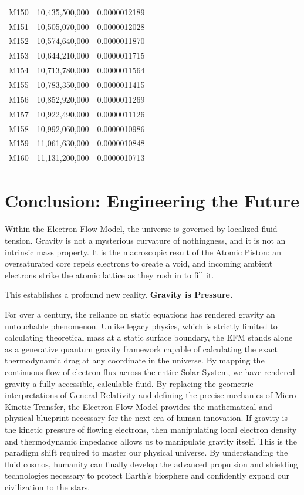 \documentclass[11pt, a4paper]{article}
\begin{document}
\begin{longtable}{@{} c c c l @{}}
  M150 & 10,435,500,000 & 0.0000012189 &  \\
  M151 & 10,505,070,000 & 0.0000012028 &  \\
  M152 & 10,574,640,000 & 0.0000011870 &  \\
  M153 & 10,644,210,000 & 0.0000011715 &  \\
  M154 & 10,713,780,000 & 0.0000011564 &  \\
  M155 & 10,783,350,000 & 0.0000011415 &  \\
  M156 & 10,852,920,000 & 0.0000011269 &  \\
  M157 & 10,922,490,000 & 0.0000011126 &  \\
  M158 & 10,992,060,000 & 0.0000010986 &  \\
  M159 & 11,061,630,000 & 0.0000010848 &  \\
  M160 & 11,131,200,000 & 0.0000010713 &  \\
\end{longtable}

\section{Conclusion: Engineering the Future}

Within the Electron Flow Model, the universe is governed by localized fluid tension. Gravity is not a mysterious curvature of nothingness, and it is not an intrinsic mass property. It is the macroscopic result of the Atomic Piston: an oversaturated core repels electrons to create a void, and incoming ambient electrons strike the atomic lattice as they rush in to fill it. 

This establishes a profound new reality. \textbf{Gravity is Pressure.} 

For over a century, the reliance on static equations has rendered gravity an untouchable phenomenon. Unlike legacy physics, which is strictly limited to calculating theoretical mass at a static surface boundary, the EFM stands alone as a generative quantum gravity framework capable of calculating the exact thermodynamic drag at any coordinate in the universe. By mapping the continuous flow of electron flux across the entire Solar System, we have rendered gravity a fully accessible, calculable fluid. By replacing the geometric interpretations of General Relativity and defining the precise mechanics of Micro-Kinetic Transfer, the Electron Flow Model provides the mathematical and physical blueprint necessary for the next era of human innovation. If gravity is the kinetic pressure of flowing electrons, then manipulating local electron density and thermodynamic impedance allows us to manipulate gravity itself. This is the paradigm shift required to master our physical universe. By understanding the fluid cosmos, humanity can finally develop the advanced propulsion and shielding technologies necessary to protect Earth's biosphere and confidently expand our civilization to the stars.
\end{document}
